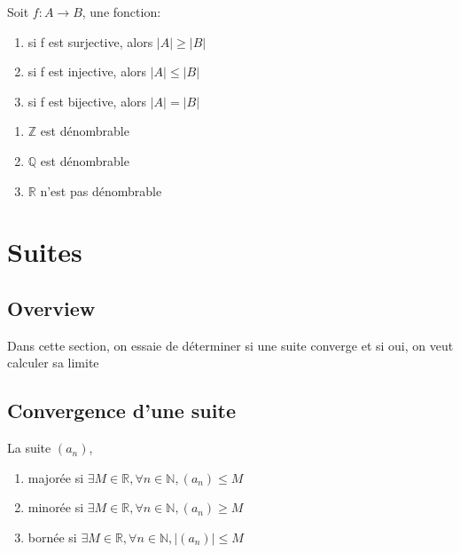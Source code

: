 \documentclass{article}
\begin{document}
\begin{theorem}
    Soit $ f:A \to B$, une fonction:
    \begin{enumerate}
	\item si f est surjective, alors $|A| \geq |B|$
	\item si f est injective, alors $|A| \leq |B|$
	\item si f est bijective, alors $|A| = |B|$
    \end{enumerate}
\end{theorem}

\begin{proposition}
    \begin{enumerate}
	\item $\mathbb{Z}$ est dénombrable
    	\item $\mathbb{Q}$ est dénombrable
    	\item $\mathbb{R}$ n'est pas dénombrable
    \end{enumerate}
\end{proposition}

\begin{remark}
\end{remark}

\pagebreak
\section{Suites}

\subsection{Overview}

Dans cette section, on essaie de déterminer si une suite converge et si oui,
on veut calculer sa limite

\subsection{Convergence d'une suite}


\begin{definition}
    La suite $(a_n)$,
    \begin{enumerate}
	\item majorée si $\exists M \in \mathbb{R}, \forall n \in \mathbb{N},
	    (a_n) \leq M$
	\item minorée si $\exists M \in \mathbb{R}, \forall n \in \mathbb{N},
	    (a_n) \geq M$
	\item bornée si $\exists M \in \mathbb{R}, \forall n \in \mathbb{N},
	    |(a_n)| \leq M$
    \end{enumerate}
\end{definition}
\end{document}
